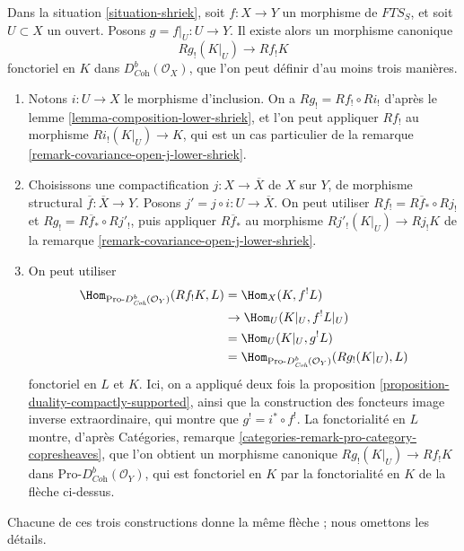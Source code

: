 \begin{remark}
\label{remark-covariance-open-lower-shriek}
Dans la situation \ref{situation-shriek}, soit $f : X \to Y$ un morphisme de $\textit{FTS}_S$, et soit $U \subset X$ un ouvert. Posons $g = f|_U : U \to Y$. Il existe alors un morphisme canonique
$$
Rg_!(K|_U) \longrightarrow Rf_!K
$$
fonctoriel en $K$ dans $D^b_{\textit{Coh}}(\mathcal{O}_X)$, que l'on peut définir d'au moins trois manières.
\begin{enumerate}
\item Notons $i : U \to X$ le morphisme d'inclusion. On a $Rg_! = Rf_! \circ Ri_!$ d'après le lemme \ref{lemma-composition-lower-shriek}, et l'on peut appliquer $Rf_!$ au morphisme $Ri_!(K|_U) \to K$, qui est un cas particulier de la remarque \ref{remark-covariance-open-j-lower-shriek}.
\item Choisissons une compactification $j : X \to \overline{X}$ de $X$ sur $Y$, de morphisme structural $\overline{f} : \overline{X} \to Y$. Posons $j' = j \circ i : U \to \overline{X}$. On peut utiliser $Rf_! = R\overline{f}_* \circ Rj_!$ et $Rg_! = R\overline{f}_* \circ Rj'_!$, puis appliquer $R\overline{f}_*$ au morphisme $Rj'_!(K|_U) \to Rj_!K$ de la remarque \ref{remark-covariance-open-j-lower-shriek}.
\item On peut utiliser
\begin{align*}
\Hom_{\text{Pro-}D^b_{\textit{Coh}}(\mathcal{O}_Y)}(Rf_!K, L)
& =
\Hom_X(K, f^!L) \\
& \to
\Hom_U(K|_U, f^!L|_U) \\
& =
\Hom_U(K|_U, g^!L) \\
& =
\Hom_{\text{Pro-}D^b_{\textit{Coh}}(\mathcal{O}_Y)}(Rg_!(K|_U), L)
\end{align*}
fonctoriel en $L$ et $K$. Ici, on a appliqué deux fois la proposition \ref{proposition-duality-compactly-supported}, ainsi que la construction des foncteurs image inverse extraordinaire, qui montre que $g^! = i^* \circ f^!$. La fonctorialité en $L$ montre, d'après Catégories, remarque \ref{categories-remark-pro-category-copresheaves}, que l'on obtient un morphisme canonique $Rg_!(K|_U) \to Rf_!K$ dans $\text{Pro-}D^b_{\textit{Coh}}(\mathcal{O}_Y)$, qui est fonctoriel en $K$ par la fonctorialité en $K$ de la flèche ci-dessus.
\end{enumerate}
Chacune de ces trois constructions donne la même flèche ; nous omettons les détails.
\end{remark}

